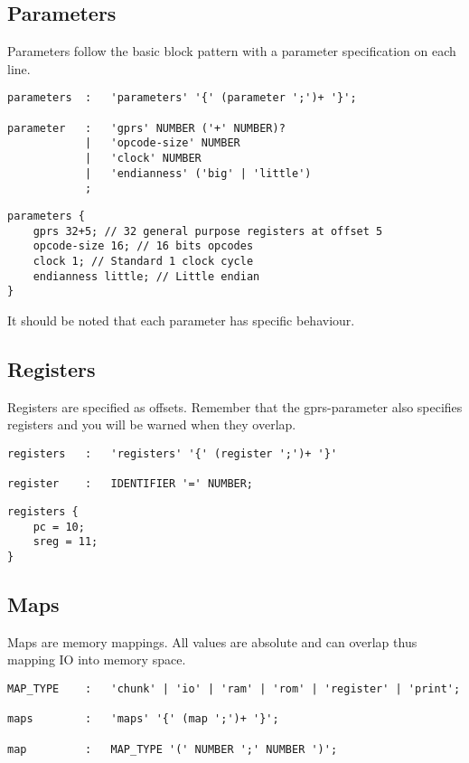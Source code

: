 \subsection{Parameters}
Parameters follow the basic block pattern with a parameter specification on
each line.

\lstset{caption=Parameter specification}
\begin{lstlisting}
parameters	:	'parameters' '{' (parameter ';')+ '}';

parameter	:	'gprs' NUMBER ('+' NUMBER)?
			|	'opcode-size' NUMBER
			|	'clock' NUMBER
			|	'endianness' ('big' | 'little')
			;
\end{lstlisting}

\lstset{caption=Example parameters}
\begin{lstlisting}
parameters {
	gprs 32+5; // 32 general purpose registers at offset 5
	opcode-size 16; // 16 bits opcodes
	clock 1; // Standard 1 clock cycle
	endianness little; // Little endian
}
\end{lstlisting}

It should be noted that each parameter has specific behaviour.

\subsection{Registers}
Registers are specified as offsets. Remember that the gprs-parameter also
specifies registers and you will be warned when they overlap.
\lstset{caption=Register specification}
\begin{lstlisting}
registers	:	'registers' '{' (register ';')+ '}'

register	:	IDENTIFIER '=' NUMBER;
\end{lstlisting}

\lstset{caption=Example register specification}
\begin{lstlisting}
registers {
	pc = 10;
	sreg = 11;
}
\end{lstlisting}

\subsection{Maps}
Maps are memory mappings. All values are absolute and can overlap thus mapping
IO into memory space.
\lstset{caption=Memory mapping specification}
\begin{lstlisting}
MAP_TYPE	:	'chunk' | 'io' | 'ram' | 'rom' | 'register' | 'print';

maps		:	'maps' '{' (map ';')+ '}';

map			:	MAP_TYPE '(' NUMBER ';' NUMBER ')';
\end{lstlisting}


